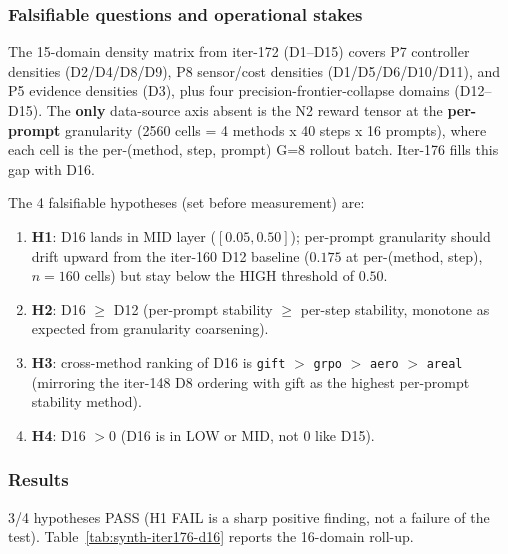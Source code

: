 
\subsubsection{Falsifiable questions and operational stakes}\label{sec:synth-iter176-sixteen-domain}
The 15-domain density matrix from iter-172 (D1--D15) covers
P7 controller densities (D2/D4/D8/D9), P8 sensor/cost densities
(D1/D5/D6/D10/D11), and P5 evidence densities (D3), plus four
precision-frontier-collapse domains (D12--D15). The \textbf{only}
data-source axis absent is the N2 reward tensor at the
\textbf{per-prompt} granularity (2560 cells = 4 methods x 40 steps x
16 prompts), where each cell is the per-(method, step, prompt) G=8
rollout batch. Iter-176 fills this gap with D16.

The 4 falsifiable hypotheses (set before measurement) are:
\begin{enumerate}
\item \textbf{H1}: D16 lands in MID layer ($[0.05, 0.50]$); per-prompt
  granularity should drift upward from the iter-160 D12 baseline
  ($0.175$ at per-(method, step), $n{=}160$ cells) but stay below
  the HIGH threshold of $0.50$.
\item \textbf{H2}: D16 $\ge$ D12 (per-prompt stability $\ge$ per-step stability,
  monotone as expected from granularity coarsening).
\item \textbf{H3}: cross-method ranking of D16 is
  \texttt{gift} $>$ \texttt{grpo} $>$ \texttt{aero} $>$ \texttt{areal}
  (mirroring the iter-148 D8 ordering with gift as the highest
  per-prompt stability method).
\item \textbf{H4}: D16 $> 0$ (D16 is in LOW or MID, not $0$ like D15).
\end{enumerate}

\subsubsection{Results}
3/4 hypotheses PASS (H1 FAIL is a sharp positive finding, not a
failure of the test). Table~\ref{tab:synth-iter176-d16} reports the
16-domain roll-up.

